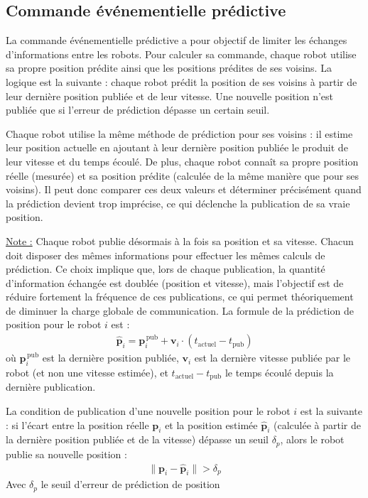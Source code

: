\subsection{Commande événementielle prédictive}

La commande événementielle prédictive a pour objectif de limiter les échanges d'informations entre les robots. Pour calculer sa commande, chaque robot utilise sa propre position prédite ainsi que les positions prédites de ses voisins. La logique est la suivante : chaque robot prédit la position de ses voisins à partir de leur dernière position publiée et de leur vitesse. Une nouvelle position n'est publiée que si l'erreur de prédiction dépasse un certain seuil.

Chaque robot utilise la même méthode de prédiction pour ses voisins : il estime leur position actuelle en ajoutant à leur dernière position publiée le produit de leur vitesse et du temps écoulé. De plus, chaque robot connaît sa propre position réelle (mesurée) et sa position prédite (calculée de la même manière que pour ses voisins). Il peut donc comparer ces deux valeurs et déterminer précisément quand la prédiction devient trop imprécise, ce qui déclenche la publication de sa vraie position. 

\underline{Note :} Chaque robot publie désormais à la fois sa position et sa vitesse. Chacun doit disposer des mêmes informations pour effectuer les mêmes calculs de prédiction. Ce choix implique que, lors de chaque publication, la quantité d'information échangée est doublée (position et vitesse), mais l'objectif est de réduire fortement la fréquence de ces publications, ce qui permet théoriquement de diminuer la charge globale de communication.
La formule de la prédiction de position pour le robot $i$ est :
\begin{align*}
    \hat{\mathbf{p}}_i = \mathbf{p}_i^{\,\text{pub}} + \mathbf{v}_i \cdot (t_{\text{actuel}} - t_{\text{pub}})
\end{align*}
où $\mathbf{p}_i^{\,\text{pub}}$ est la dernière position publiée, $\mathbf{v}_i$ est la dernière vitesse publiée par le robot (et non une vitesse estimée), et $t_{\text{actuel}} - t_{\text{pub}}$ le temps écoulé depuis la dernière publication.

La condition de publication d'une nouvelle position pour le robot $i$ est la suivante : si l'écart entre la position réelle $\mathbf{p}_i$ et la position estimée $\hat{\mathbf{p}}_i$ (calculée à partir de la dernière position publiée et de la vitesse) dépasse un seuil $\delta_p$, alors le robot publie sa nouvelle position :
    \begin{align*}
        \|\mathbf{p}_i - \hat{\mathbf{p}}_i\| > \delta_p
    \end{align*}
Avec $\delta_p$ le seuil d'erreur de prédiction de position


